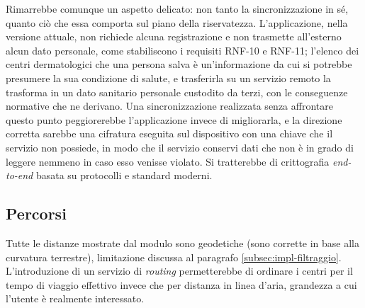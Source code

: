 Rimarrebbe comunque un aspetto delicato: non tanto la sincronizzazione in sé, quanto ciò che essa comporta sul piano della riservatezza.
L'applicazione, nella versione attuale, non richiede alcuna registrazione e non trasmette all'esterno alcun dato personale,
come stabiliscono i requisiti RNF-10 e RNF-11; l'elenco dei centri dermatologici che una persona salva è un'informazione
da cui si potrebbe presumere la sua condizione di salute, e trasferirla su un servizio remoto la trasforma in un dato
sanitario personale custodito da terzi, con le conseguenze normative che ne derivano.
Una sincronizzazione realizzata senza affrontare questo punto peggiorerebbe l'applicazione invece di migliorarla, e la direzione
corretta sarebbe una cifratura eseguita sul dispositivo con una chiave che il servizio non possiede, in modo che il servizio
conservi dati che non è in grado di leggere nemmeno in caso esso venisse violato.
Si tratterebbe di crittografia \textit{end-to-end} basata su protocolli e standard moderni. %

\subsection{Percorsi}\label{subsec:futuro-percorsi}

Tutte le distanze mostrate dal modulo sono geodetiche (sono corrette in base alla curvatura terrestre), limitazione
discussa al paragrafo \ref{subsec:impl-filtraggio}.
L'introduzione di un servizio di \textit{routing} permetterebbe di ordinare i centri per il tempo di viaggio effettivo
invece che per distanza in linea d'aria, grandezza a cui l'utente è realmente interessato.

